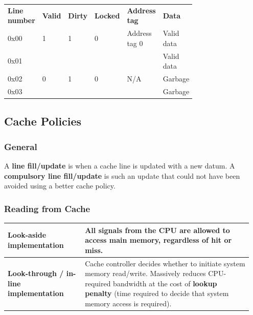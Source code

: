 			\begin{table}[H]
				\centering
				\begin{tabular}{p{0.15\linewidth}|p{0.06\linewidth}|p{0.06\linewidth}|p{0.06\linewidth}|p{0.2\linewidth}|p{0.2\linewidth}|}
					\cline{2-6}
						\textbf{Line number}
							& \textbf{Valid}
							& \textbf{Dirty}
							& \textbf{Locked}
							& \textbf{Address tag}
							& \textbf{Data}\\
					\cline{2-6}
						0x00
							& 1
							& 1
							& 0
							& Address tag 0
							& Valid data\\
					\cline{2-6}
						0x01
							& 
							& 
							& 
							& 
							& Valid data\\
					\cline{2-6}
						0x02
							& 0
							& 1
							& 0
							& N/A
							& Garbage\\
					\cline{2-6}
						0x03
							& 
							& 
							& 
							& 
							& Garbage\\
					\cline{2-6}
				\end{tabular}
			\end{table}	

	\subsection{Cache Policies}
		\subsubsection{General}
			A \textbf{line fill/update} is when a cache line is updated with a new datum. A \textbf{compulsory line fill/update} is such an update that could not have been avoided using a better cache policy.
			
		\subsubsection{Reading from Cache}
			\begin{table}[H]
				\centering
				\begin{tabular}{|>{\bfseries}p{0.3\linewidth}|p{0.65\linewidth}|}
					\hline
					Look-aside implementation
						& All signals from the CPU are allowed to access main memory, regardless of hit or miss.\\
					\hline
					Look-through / in-line implementation
						& Cache controller decides whether to initiate system memory read/write. Massively reduces CPU-required bandwidth at the cost of \textbf{lookup penalty} (time required to decide that system memory access is required). \\
					\hline
				\end{tabular}
			\end{table}
			
